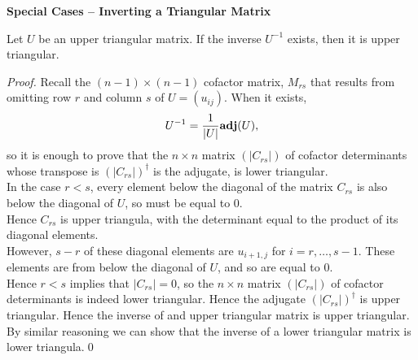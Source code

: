 {\bf Special Cases -- Inverting a Triangular Matrix}
\begin{theorem}
Let $U$ be an upper triangular matrix. If the inverse $U^{-1}$ exists, then it is upper triangular.
\end{theorem}
\begin{proof}
Recall the $(n-1)\times(n-1)$ cofactor matrix, $M_{rs}$ that results from omitting row $r$ and column $s$ of $U = (u_{ij})$. 
When it exists, \[ U^{-1} = {1\over|U|}{\bf adj}(U),\] so it is enough to prove that the $n \times n$ matrix $(|C_{rs}|)$ of cofactor determinants whose transpose
is $(|C_{rs}|)^\dagger$ is the adjugate, is lower triangular.\\

In the case $r < s$, every element below the diagonal of the matrix $C_{rs}$ is also below the diagonal of $U$, so must be equal to $0$.\\

Hence $C_{rs}$ is upper triangula, with the determinant equal to the product of its diagonal elements.\\

However, $s-r$ of these diagonal elements are $u_{i+1,j}$ for $i=r,\hdots,s-1$. These elements are from below the diagonal of $U$, and so are equal to $0$. \\

Hence $r <  s$ implies that $|C_{rs}| = 0$, so the $n\times n$ matrix $(|C_{rs}|)$ of cofactor determinants is indeed lower triangular. Hence the adjugate 
$(|C_{rs}|)^\dagger$ is upper triangular. Hence the inverse of and upper triangular matrix is upper triangular. By similar reasoning we can show that the 
inverse of a lower triangular matrix is lower triangula.\qed
\end{proof}


